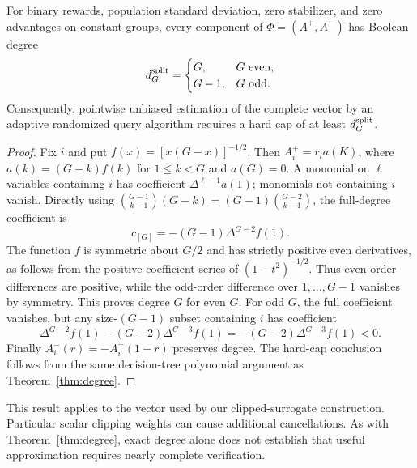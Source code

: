 \begin{theorem}\label{thm:sign-degree}
For binary rewards, population standard deviation, zero stabilizer, and zero advantages on constant groups, every component of $\Phi=(A^+,A^-)$ has Boolean degree
\[
 d_G^{\rm split}=\begin{cases}G,&G\text{ even},\\G-1,&G\text{ odd}.\end{cases}
\]
Consequently, pointwise unbiased estimation of the complete vector by an adaptive randomized query algorithm requires a hard cap of at least $d_G^{\rm split}$.
\end{theorem}
\begin{proof}
Fix $i$ and put $f(x)=[x(G-x)]^{-1/2}$. Then $A_i^+=r_i a(K)$, where $a(k)=(G-k)f(k)$ for $1\le k<G$ and $a(G)=0$. A monomial on $\ell$ variables containing $i$ has coefficient $\Delta^{\ell-1}a(1)$; monomials not containing $i$ vanish. Directly using $\binom{G-1}{k-1}(G-k)=(G-1)\binom{G-2}{k-1}$, the full-degree coefficient is
\[
 c_{[G]}=-(G-1)\Delta^{G-2}f(1).
\]
The function $f$ is symmetric about $G/2$ and has strictly positive even derivatives, as follows from the positive-coefficient series of $(1-t^2)^{-1/2}$. Thus even-order differences are positive, while the odd-order difference over $1,\ldots,G-1$ vanishes by symmetry. This proves degree $G$ for even $G$. For odd $G$, the full coefficient vanishes, but any size-$(G-1)$ subset containing $i$ has coefficient
\[
 \Delta^{G-2}f(1)-(G-2)\Delta^{G-3}f(1)
 =-(G-2)\Delta^{G-3}f(1)<0.
\]
Finally $A_i^-(r)=-A_i^+(1-r)$ preserves degree. The hard-cap conclusion follows from the same decision-tree polynomial argument as Theorem~\ref{thm:degree}.
\end{proof}
This result applies to the vector used by our clipped-surrogate construction. Particular scalar clipping weights can cause additional cancellations. As with Theorem~\ref{thm:degree}, exact degree alone does not establish that useful approximation requires nearly complete verification.
